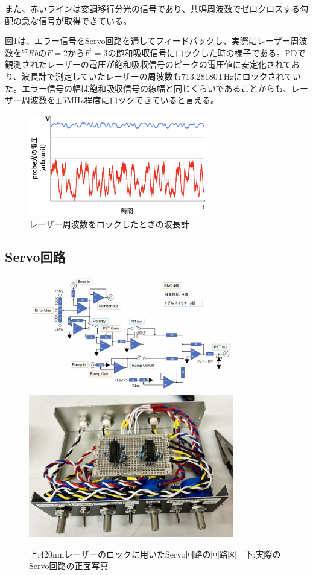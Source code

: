 \documentclass[dvipdfmx]{jsreport}
\begin{document}
また、赤いラインは変調移行分光の信号であり、共鳴周波数でゼロクロスする勾配の急な信号が取得できている。

図\ref{fig:mt-lock}は、エラー信号をServo回路を通してフィードバックし、実際にレーザー周波数を$^{87}Rb$の$F=2$から$F^{'}=3$の飽和吸収信号にロックした時の様子である。PDで観測されたレーザーの電圧が飽和吸収信号のピークの電圧値に安定化されており、波長計で測定していたレーザーの周波数も713.28180THzにロックされていた。エラー信号の幅は飽和吸収信号の線幅と同じくらいであることからも、レーザー周波数を$\pm 5$MHz程度にロックできていると言える。
\begin{figure}
\centering
\includegraphics[width=0.7\textwidth]{images/mt_lock.png}
\caption{\label{fig:mt-lock}レーザー周波数をロックしたときの波長計}
\end{figure}

\subsection{Servo回路}

\begin{figure}
\centering
\includegraphics[width=0.8\textwidth]{images/servo.png}
\includegraphics[width=0.8\textwidth]{images/servo_real.jpg}
\caption{\label{fig:servo}上:420nmレーザーのロックに用いたServo回路の回路図　下:実際のServo回路の正面写真}
\end{figure}
\end{document}
